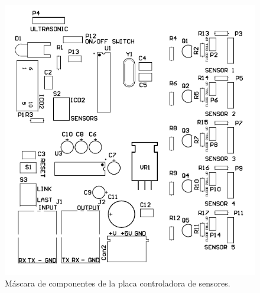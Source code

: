 \begin{figure}
	\centering
	\includegraphics[scale=.3]{figuras/sense_componentes.png}
	\caption{M\'ascara de componentes de la placa controladora de sensores.}
	\label{hF_placa_sense_componentes}
\end{figure}

